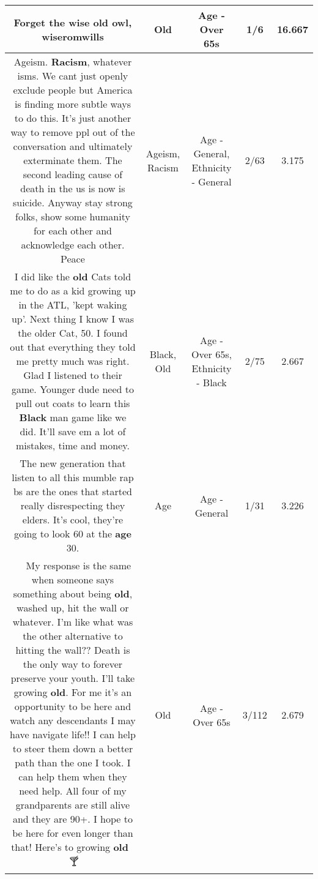 \documentclass[11pt]{article}
\newlength\mylength
\begin{document}
\begin{center}
\begin{longtable}{|C{.65\mylength}|C{.30\mylength}|C{.12\mylength}|C{.12\mylength}|C{.12\mylength}|}
  \small Forget the wise \textbf{old} owl, wiseromwills\normalsize   & Old & Age - Over 65s & 1/6 & 16.667 \\  \hline
  \small Ageism. \textbf{Racism}, whatever isms. We cant just openly exclude people but America is finding more subtle ways to do this. It's just another way to remove ppl out of the conversation and ultimately exterminate them. The second leading cause of death in the us is  now is suicide. Anyway stay strong folks, show some humanity for each other and acknowledge each other. Peace\normalsize   & Ageism, Racism & Age - General, Ethnicity - General & 2/63 & 3.175 \\  \hline
  \small I did like the \textbf{old} Cats told me to do as a kid growing up in the ATL, 'kept waking up'. Next thing I know I was the older Cat, 50. I found out that everything they told me pretty much was right. Glad I listened to their game. Younger dude need to pull out coats to learn this \textbf{Black} man game like we did. It'll save em a lot of mistakes, time and money.\normalsize   & Black, Old & Age - Over 65s, Ethnicity - Black & 2/75 & 2.667 \\  \hline
  \small The new generation that listen to all this mumble rap bs are the ones that started really disrespecting they elders. It's cool, they're going to look 60 at the \textbf{age} 30.\normalsize   & Age & Age - General & 1/31 & 3.226 \\  \hline
  \small 💯💯💯 My response is the same when someone says something about being \textbf{old}, washed up, hit the wall or whatever. I'm like what was the other alternative to hitting the wall?? Death is the only way to forever preserve your youth. I'll take growing \textbf{old}. For me it's an opportunity to be here and watch any descendants I may have navigate life!! I can help to steer them down a better path than the one I took. I can help them when they need help. All four of my grandparents are still alive and they are 90+. I hope to be here for even longer than that! Here's to growing \textbf{old} 🥂🍾🍸\normalsize   & Old & Age - Over 65s & 3/112 & 2.679 \\  \hline

\end{longtable}
\end{center}
\end{document}

